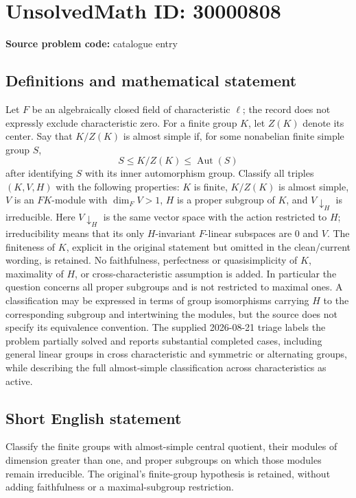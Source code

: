 \documentclass[11pt]{article}
\begin{document}
\section*{UnsolvedMath ID: 30000808}
\textbf{Source problem code:} catalogue entry
\subsection{Definitions and mathematical statement}
Let $F$ be an algebraically closed field of characteristic $\ell$; the record does not expressly exclude characteristic zero. For a finite group $K$, let $Z(K)$ denote its center. Say that $K/Z(K)$ is almost simple if, for some nonabelian finite simple group $S$, \[S\leq K/Z(K)\leq\operatorname{Aut}(S)\] after identifying $S$ with its inner automorphism group. Classify all triples $(K,V,H)$ with the following properties: $K$ is finite, $K/Z(K)$ is almost simple, $V$ is an $FK$-module with $\dim_FV>1$, $H$ is a proper subgroup of $K$, and $V\!\downarrow_H$ is irreducible. Here $V\!\downarrow_H$ is the same vector space with the action restricted to $H$; irreducibility means that its only $H$-invariant $F$-linear subspaces are $0$ and $V$. The finiteness of $K$, explicit in the original statement but omitted in the clean/current wording, is retained. No faithfulness, perfectness or quasisimplicity of $K$, maximality of $H$, or cross-characteristic assumption is added. In particular the question concerns all proper subgroups and is not restricted to maximal ones. A classification may be expressed in terms of group isomorphisms carrying $H$ to the corresponding subgroup and intertwining the modules, but the source does not specify its equivalence convention. The supplied 2026-08-21 triage labels the problem partially solved and reports substantial completed cases, including general linear groups in cross characteristic and symmetric or alternating groups, while describing the full almost-simple classification across characteristics as active.
\subsection{Short English statement}
Classify the finite groups with almost-simple central quotient, their modules of dimension greater than one, and proper subgroups on which those modules remain irreducible. The original's finite-group hypothesis is retained, without adding faithfulness or a maximal-subgroup restriction.
\end{document}
